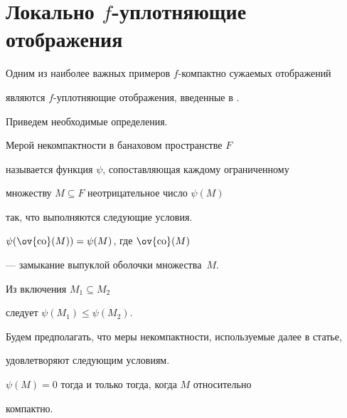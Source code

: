 \section{Локально $f$-уплотняющие отображения}





Одним из наиболее важных примеров $f$-компактно сужаемых отображений


являются $f$-уплотняющие отображения, введенные в \cite{9}.


Приведем необходимые определения.





\begin{defns}


Мерой некомпактности в банаховом пространстве $F$


называется функция $\psi$, сопоставляющая каждому ограниченному 


множеству $M \subseteq F$ неотрицательное число $\psi (M)$


так, что выполняются следующие условия.





\begin{conds}


$ \psi (\ov {\co}(M)) = \psi (M)$, где $\ov {\co}(M)$


--- замыкание выпуклой оболочки множества~$M$.


\end{conds}





\begin{conds}


Из включения $M_1 \subseteq M_2$


следует $\psi (M_1) \leq \psi (M_2)$.


\end{conds}


\end{defns}





Будем предполагать, что меры некомпактности, используемые далее в статье,


удовлетворяют следующим условиям.





\begin{conds}


$\psi (M) = 0$ тогда и только тогда, когда $M$ относительно


компактно.


\end{conds}





